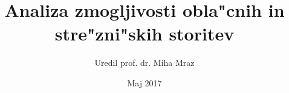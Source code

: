 \documentclass[slovene]{book}
\begin{document}
\author{Uredil prof. dr. Miha Mraz}
\title{Analiza zmogljivosti obla"cnih in stre"zni"skih storitev}
\date{Maj 2017}
\maketitle

\frontmatter
\tableofcontents


\mainmatter



\backmatter
%
%
\printindex %
\end{document}
